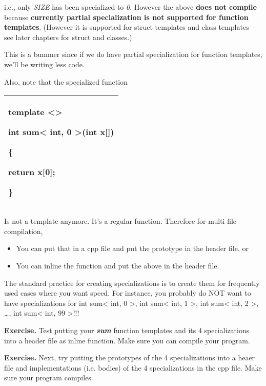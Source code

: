 \documentclass[
]{article}
\providecommand{\tightlist}{%
  \setlength{\itemsep}{0pt}\setlength{\parskip}{0pt}}
\begin{document}
i.e., only \emph{SIZE} has been specialized to \emph{0}. However the
above \textbf{does not compile} because \textbf{currently partial
specialization is not supported for function templates}. (However it is
supported for struct templates and class templates -- see later chapters
for struct and classes.)

This is a bummer since if we do have partial specialization for function
templates, we'll be writing less code.

Also, note that the specialized function

\begin{longtable}[]{@{}l@{}}
\toprule
\endhead
\begin{minipage}[t]{0.97\columnwidth}\raggedright
template \textless\textgreater{}

int sum\textless{} int, 0 \textgreater(int x{[}{]})

\{

return x{[}0{]};

\}\strut
\end{minipage}\tabularnewline
\bottomrule
\end{longtable}

Is not a template anymore. It's a regular function. Therefore for
multi-file compilation,

\begin{itemize}
\tightlist
\item
  You can put that in a cpp file and put the prototype in the header
  file, or
\item
  You can inline the function and put the above in the header file.
\end{itemize}

The standard practice for creating specializations is to create them for
frequently used cases where you want speed. For instance, you probably
do NOT want to have specializations for int sum\textless{} int, 0
\textgreater, int sum\textless{} int, 1 \textgreater, int sum\textless{}
int, 2 \textgreater, \ldots, int sum\textless{} int, 99 \textgreater!!!

\textbf{Exercise.} Test putting your \emph{\textbf{sum}} function
templates and its 4 specializations into a header file as inline
function. Make sure you can compile your program.

\textbf{Exercise.} Next, try putting the prototypes of the 4
specializations into a heaer file and implementations (i.e. bodies) of
the 4 specializations in the cpp file. Make sure your program compiles.
\end{document}

